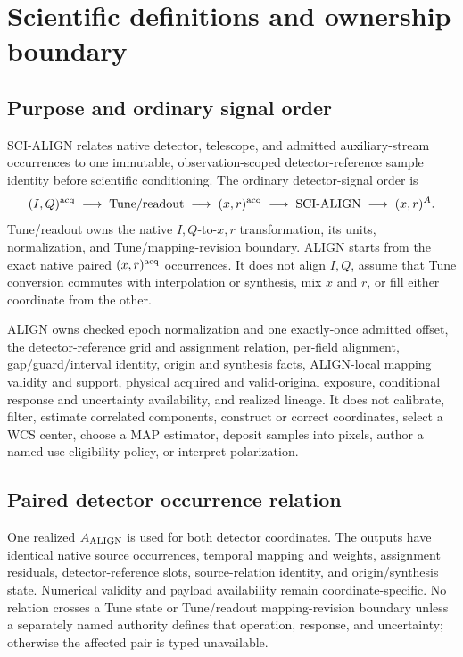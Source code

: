 \section{Scientific definitions and ownership boundary}
\label{sec:definitions}

\subsection{Purpose and ordinary signal order}

SCI-ALIGN relates native detector, telescope, and admitted auxiliary-stream
occurrences to one immutable, observation-scoped detector-reference sample
identity before scientific conditioning.  The ordinary detector-signal order
is
\[
 (I,Q)^{\rm acq}\;\longrightarrow\;\text{Tune/readout}
 \;\longrightarrow\;(x,r)^{\rm acq}
 \;\longrightarrow\;\text{SCI-ALIGN}
 \;\longrightarrow\;(x,r)^A .
\]
Tune/readout owns the native \(I,Q\)-to-\(x,r\) transformation, its units,
normalization, and Tune/mapping-revision boundary.  ALIGN starts from the exact
native paired \((x,r)^{\rm acq}\) occurrences.  It does not align \(I,Q\),
assume that Tune conversion commutes with interpolation or synthesis, mix
\(x\) and \(r\), or fill either coordinate from the other.

ALIGN owns checked epoch normalization and one exactly-once admitted offset,
the detector-reference grid and assignment relation, per-field alignment,
gap/guard/interval identity, origin and synthesis facts, ALIGN-local mapping
validity and support, physical acquired and valid-original exposure,
conditional response and uncertainty
availability, and realized lineage.  It does not calibrate, filter, estimate
correlated components, construct or correct coordinates, select a WCS center,
choose a MAP estimator, deposit samples into pixels, author a named-use
eligibility policy, or interpret polarization.

\subsection{Paired detector occurrence relation}

One realized \(A_{\rm ALIGN}\) is used for both detector coordinates.  The
outputs have identical native source occurrences, temporal mapping and
weights, assignment residuals, detector-reference slots, source-relation
identity, and origin/synthesis state.  Numerical validity and payload
availability remain coordinate-specific.  No relation crosses a Tune state or
Tune/readout mapping-revision boundary unless a separately named authority
defines that operation, response, and uncertainty; otherwise the affected
pair is typed unavailable.

